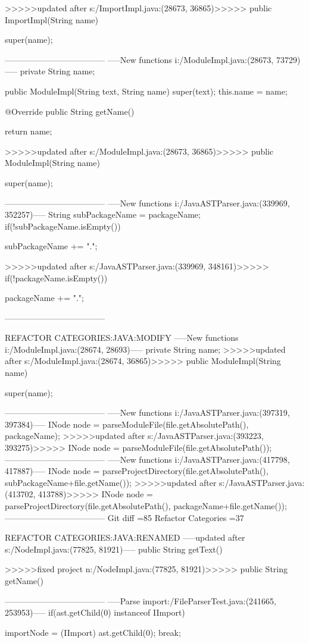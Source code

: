 {{{{{{{{{{{{{{{>>>>>updated after s:/ImportImpl.java:(28673, 36865)>>>>>
	public ImportImpl(String name) {
		super(name);
	
------------------------------------
-----New functions i:/ModuleImpl.java:(28673, 73729)-----
	private String name;
	
	
	public ModuleImpl(String text, String name) {
		super(text);
		this.name = name;
	}

	@Override
	public String getName() {
		return name;
	
>>>>>updated after s:/ModuleImpl.java:(28673, 36865)>>>>>
	public ModuleImpl(String name) {
		super(name);
	
------------------------------------
-----New functions i:/JavaASTParser.java:(339969, 352257)-----
		String subPackageName = packageName;
		if(!subPackageName.isEmpty()){
			subPackageName += ".";
	
>>>>>updated after s:/JavaASTParser.java:(339969, 348161)>>>>>
		if(!packageName.isEmpty()){
			packageName += ".";
	
------------------------------------

REFACTOR CATEGORIES:JAVA:MODIFY
-----New functions i:/ModuleImpl.java:(28674, 28693)-----
private String name;
>>>>>updated after s:/ModuleImpl.java:(28674, 36865)>>>>>
public ModuleImpl(String name) {
		super(name);
	
------------------------------------
-----New functions i:/JavaASTParser.java:(397319, 397384)-----
INode node = parseModuleFile(file.getAbsolutePath(), packageName);
>>>>>updated after s:/JavaASTParser.java:(393223, 393275)>>>>>
INode node = parseModuleFile(file.getAbsolutePath());
------------------------------------
-----New functions i:/JavaASTParser.java:(417798, 417887)-----
INode node = parseProjectDirectory(file.getAbsolutePath(), subPackageName+file.getName());
>>>>>updated after s:/JavaASTParser.java:(413702, 413788)>>>>>
INode node = parseProjectDirectory(file.getAbsolutePath(), packageName+file.getName());
------------------------------------
Git diff =85  Refactor Categories =37

REFACTOR CATEGORIES:JAVA:RENAMED
-----updated after s:/NodeImpl.java:(77825, 81921)-----
	public String getText() {
	
>>>>>fixed project n:/NodeImpl.java:(77825, 81921)>>>>>
	public String getName() {
	
------------------------------------
-----Parse import:/FileParserTest.java:(241665, 253953)-----
			if(ast.getChild(0) instanceof IImport){
				importNode = (IImport) ast.getChild(0);
				break;
	
}}}}}}}}}}}}}}}}}}}}}}}}
